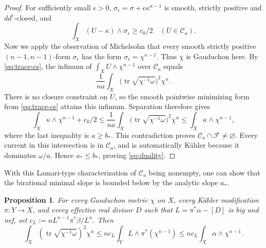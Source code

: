 \documentclass[reqno]{amsart}
\numberwithin{equation}{section}
\newtheorem{proposition}[theorem]{Proposition}
\theoremstyle{definition}
\DeclareMathOperator{\tr}{tr}
\newcommand{\cC}{\mathcal C}
\begin{document}
\begin{proof}
For sufficiently small $\epsilon>0$,
$\sigma_\epsilon=\sigma+\epsilon\kappa^{n-1}$ is smooth, strictly positive and $dd^c$-closed, and
\[
\int_X(U-\kappa)\wedge\sigma_\epsilon\geq c_0/2
\quad(U\in\mathscr C_a).
\] Now we apply the observation of Michelsohn \cite[pp.~279--280]{M82} that 
every smooth strictly positive $(n-1,n-1)$-form $\sigma_\epsilon$ has the form $\sigma_\epsilon=\chi^{n-1}$. Thus $\chi$ is Gauduchon here.
By \eqref{eq:trace-cs}, the infimum of $\int_XU\wedge\chi^{n-1}$ over $\mathscr C_a$ equals
\[
\frac1{na}\int_X
\big(\tr\sqrt{\chi^{-1}\omega}\big)^2\chi^n.
\]
There is no closure constraint on $U$, so the smooth pointwise minimizing form from \eqref{eq:trace-cs} attains this infimum. Separation therefore gives
\[
\int_X\kappa\wedge\chi^{n-1}+c_0/2
\leq\frac1{na}\int_X
\big(\tr\sqrt{\chi^{-1}\omega}\big)^2\chi^n
\leq\int_X\kappa\wedge\chi^{n-1},
\]
where the last inequality is $a\geq b_*$. This contradiction proves
$\mathscr C_a\cap\mathscr F\ne\varnothing$.
Every current in this intersection is in $\mathcal C_a$, and is automatically K\"ahler because it dominates $\omega/a$.
Hence $a_*\leq b_*$, proving \eqref{eq:duality}.

\end{proof}

With this Lamari-type characterization of $\cC_{a}$ being nonempty, one can show that the birational minimal slope is bounded below by the analytic slope $a_*$. 
\begin{proposition}\label{prop:slope-comparison}
For every Gauduchon metric $\chi$ on $X$, every K\"ahler modification $\pi:Y\to X$, and every effective real divisor $D$ such that $L=\pi^*\alpha-[D]$ is big and nef, set $c_L:=nL^{n-1}\pi^*\beta/L^n$. Then 
\begin{equation}\label{eq:slope-comparison}
\int_X(\tr\sqrt{\chi^{-1}\omega})^2\chi^n\leq n c_L\int_Y L\wedge\pi^*(\chi^{n-1})
\leq n c_L\int_X\alpha\wedge\chi^{n-1}.
\end{equation}
\end{proposition}
\end{document}
